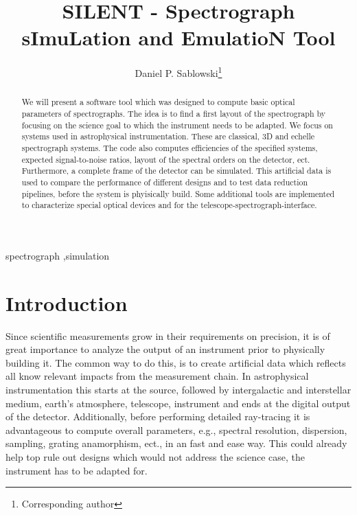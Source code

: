 \documentclass[preprint,12pt,authoryear]{elsarticle}
\begin{document}
\begin{frontmatter}

\title{SILENT - Spectrograph sImuLation and EmulatioN Tool}

\author{Daniel P. Sablowski\thanks{Corresponding author }}

\address{Leibniz Institut for Astrophysics Potsdam (AIP), An der Sternwarte 16, D-14482 Potsdam}

\begin{abstract}
We will present a software tool which was designed to compute basic optical parameters of spectrographs. The idea is to find a first
layout of the spectrograph by focusing on the science goal to which the instrument needs to be adapted.  We focus on systems used
in astrophysical instrumentation. These are classical, 3D and echelle spectrograph systems. The code also computes efficiencies of
the specified systems, expected signal-to-noise ratios, layout of the spectral orders on the detector, ect. Furthermore, a complete
frame of the detector can be simulated. This artificial data is used to compare the performance of different designs and to test
data reduction pipelines, before the system is phyisically build. Some additional tools are implemented to characterize special
optical  devices and for the telescope-spectrograph-interface.

\end{abstract}

\begin{keyword}

spectrograph \sep simulation



\end{keyword}

\end{frontmatter}


\section{Introduction}
\label{Intro}

Since scientific measurements grow in their requirements on precision, it is of great importance to analyze the output of an instrument
prior to physically building it. The common way to do this, is to create artificial data which reflects all know relevant impacts from
the measurement chain. In astrophysical instrumentation this starts at the source, followed by intergalactic and interstellar medium,
earth's atmosphere, telescope, instrument and ends at the digital output of the detector.
Additionally, before performing detailed ray-tracing it is advantageous to compute overall parameters, e.g., spectral resolution, dispersion,
sampling, grating anamorphism, ect., in an fast and ease way. This could already help top rule out designs which would not address the 
science case, the instrument has to be adapted for. 
\end{document}
